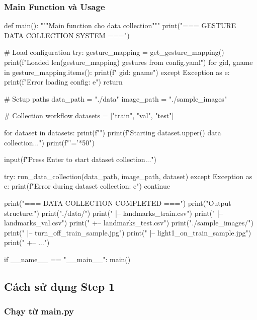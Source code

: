 \subsubsection{Main Function và Usage}

\begin{aivncodebox}
\begin{python}
def main():
    """Main function cho data collection"""
    print("=== GESTURE DATA COLLECTION SYSTEM ===")
    
    # Load configuration
    try:
        gesture_mapping = get_gesture_mapping()
        print(f"Loaded {len(gesture_mapping)} gestures from config.yaml")
        for gid, gname in gesture_mapping.items():
            print(f"  {gid}: {gname}")
    except Exception as e:
        print(f"Error loading config: {e}")
        return
    
    # Setup paths
    data_path = "./data"
    image_path = "./sample_images"
    
    # Collection workflow
    datasets = ["train", "val", "test"]
    
    for dataset in datasets:
        print(f"")
        print(f"Starting {dataset.upper()} data collection...")
        print(f"{'='*50}")
        
        input(f"Press Enter to start {dataset} collection...")
        
        try:
            run_data_collection(data_path, image_path, dataset)
        except Exception as e:
            print(f"Error during {dataset} collection: {e}")
            continue
    
    print("\n=== DATA COLLECTION COMPLETED ===")
    print("Output structure:")
    print("./data/")
    print("  |-- landmarks_train.csv")
    print("  |-- landmarks_val.csv") 
    print("  +-- landmarks_test.csv")
    print("./sample_images/")
    print("  |-- turn_off_train_sample.jpg")
    print("  |-- light1_on_train_sample.jpg")
    print("  +-- ...")

if __name__ == "__main__":
    main()
\end{python}
\end{aivncodebox}

\subsection{Cách sử dụng Step 1}

\subsubsection{Chạy từ main.py}

